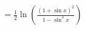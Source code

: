 \documentclass[preview]{standalone}
\begin{document}
\begin{align*}
=\frac{1}{2} \ln \left( \frac{(1 + \sin{x})^2}{1 - \sin^2{x}} \right)
\end{align*}
\end{document}
